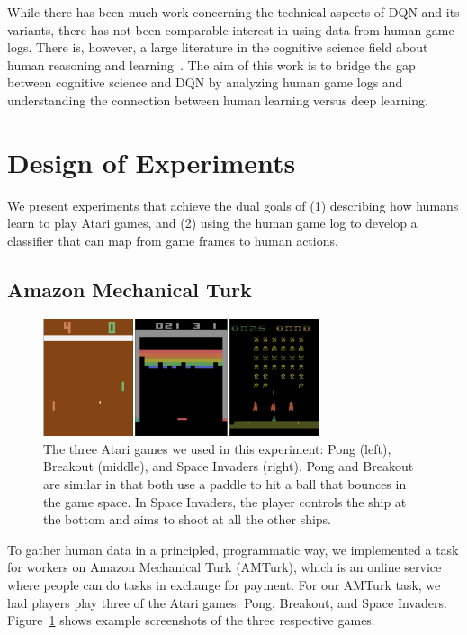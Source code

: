 \documentclass[letterpaper, 10 pt, conference]{ieeeconf}  %
\begin{document}
While there has been much work concerning the technical aspects of DQN and its variants, there has
not been comparable interest in using data from human game logs. There is, however, a large
literature in the cognitive science field about human reasoning and
learning~\cite{stenninghuman,Friedenberg_Silverman_2006,NAP9853}.  The aim of this work is to bridge the gap
between cognitive science and DQN by analyzing human game logs and understanding the connection
between human learning versus deep learning.


\section{Design of Experiments}\label{sec:experiments}

We present experiments that achieve the dual goals of (1) describing how humans learn to play Atari
games, and (2) using the human game log to develop a classifier that can map from game frames to
human actions.

\subsection{Amazon Mechanical Turk}\label{ssec:human_experiment}

\begin{figure}[t]
\centering
\includegraphics[width=3.2in]{fig_atari_games}
\caption{The three Atari games we used in this experiment: Pong (left), Breakout (middle), and Space
Invaders (right). Pong and Breakout are similar in that both use a paddle to hit a ball that bounces
in the game space. In Space Invaders, the player controls the ship at the bottom and aims to shoot
at all the other ships.}
\label{fig:atari}
\end{figure}

To gather human data in a principled, programmatic way, we implemented a task for workers on Amazon
Mechanical Turk (AMTurk), which is an online service where people can do tasks in exchange for
payment. For our AMTurk task, we had players play three of the Atari games: Pong, Breakout, and
Space Invaders. Figure~\ref{fig:atari} shows example screenshots of the three respective games.
\end{document}
